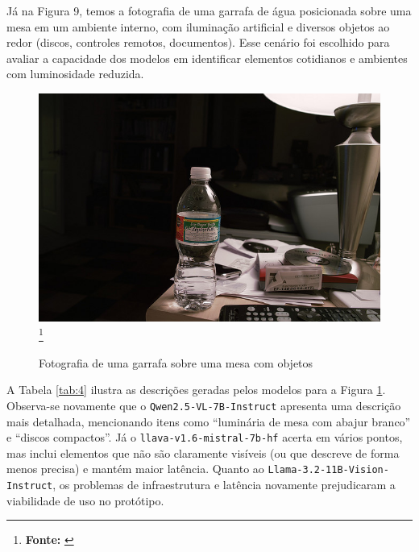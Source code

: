 Já na Figura 9, temos a fotografia de uma garrafa de água posicionada sobre uma mesa em um ambiente interno, com iluminação artificial e diversos objetos ao redor (discos, controles remotos, documentos). Esse cenário foi escolhido para avaliar a capacidade dos modelos em identificar elementos cotidianos e ambientes com luminosidade reduzida.

\begin{figure}[!ht]
     \caption{Fotografia de uma garrafa sobre uma mesa com objetos}
     \centering
     \includegraphics[width=0.7\linewidth]{imagens/garrafa.jpg}
     \label{fig:9}
     \footnote{\textbf{Fonte:} \cite{bromonschenkel2024cocopt}}
\end{figure}

A Tabela \ref{tab:4} ilustra as descrições geradas pelos modelos para a Figura \ref{fig:9}. Observa-se novamente que o \texttt{Qwen2.5-VL-7B-Instruct} apresenta uma descrição mais detalhada, mencionando itens como “luminária de mesa com abajur branco” e “discos compactos”. Já o \texttt{llava-v1.6-mistral-7b-hf} acerta em vários pontos, mas inclui elementos que não são claramente visíveis (ou que descreve de forma menos precisa) e mantém maior latência. Quanto ao \texttt{Llama-3.2-11B-Vision-Instruct}, os problemas de infraestrutura e latência novamente prejudicaram a viabilidade de uso no protótipo.

